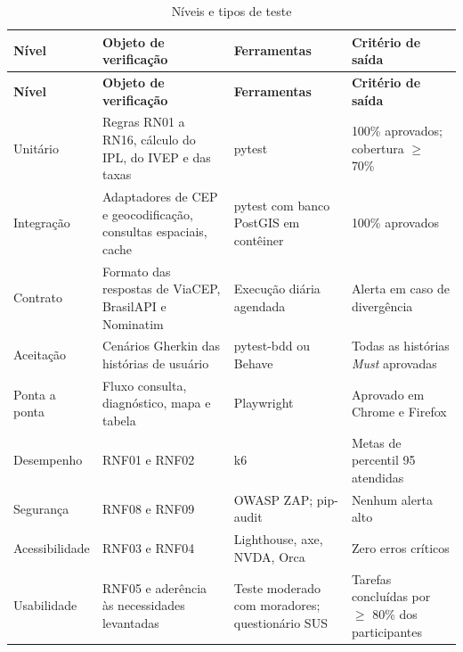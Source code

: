 \begin{longtable}{L{2.6cm}L{5.0cm}L{3.5cm}L{3.0cm}}
	\caption{Níveis e tipos de teste}
	\label{qua:niveis}                                                                                                                                                                       \\
	\toprule
	\textbf{Nível} & \textbf{Objeto de verificação}                                  & \textbf{Ferramentas}                           & \textbf{Critério de saída}                           \\
	\midrule
	\endfirsthead
	\toprule
	\textbf{Nível} & \textbf{Objeto de verificação}                                  & \textbf{Ferramentas}                           & \textbf{Critério de saída}                           \\
	\midrule
	\endhead
	\bottomrule
	\endfoot
	Unitário       & Regras RN01 a RN16, cálculo do IPL, do IVEP e das taxas         & pytest                                         & 100\% aprovados; cobertura $\geq$ 70\%               \\
	Integração     & Adaptadores de CEP e geocodificação, consultas espaciais, cache & pytest com banco PostGIS em contêiner          & 100\% aprovados                                      \\
	Contrato       & Formato das respostas de ViaCEP, BrasilAPI e Nominatim          & Execução diária agendada                       & Alerta em caso de divergência                        \\
	Aceitação      & Cenários Gherkin das histórias de usuário                       & pytest-bdd ou Behave                           & Todas as histórias \emph{Must} aprovadas             \\
	Ponta a ponta  & Fluxo consulta, diagnóstico, mapa e tabela                      & Playwright                                     & Aprovado em Chrome e Firefox                         \\
	Desempenho     & RNF01 e RNF02                                                   & k6                                             & Metas de percentil 95 atendidas                      \\
	Segurança      & RNF08 e RNF09                                                   & OWASP ZAP; pip-audit                           & Nenhum alerta alto                                   \\
	Acessibilidade & RNF03 e RNF04                                                   & Lighthouse, axe, NVDA, Orca                    & Zero erros críticos                                  \\
	Usabilidade    & RNF05 e aderência às necessidades levantadas                    & Teste moderado com moradores; questionário SUS & Tarefas concluídas por $\geq$ 80\% dos participantes \\
\end{longtable}
\vspace{-0.4cm}

